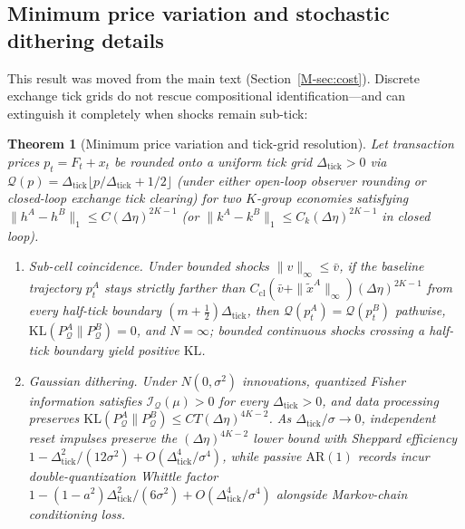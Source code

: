 \documentclass[12pt]{article}
\newtheorem{theorem}{Theorem}[section]
\theoremstyle{definition}
\theoremstyle{remark}
\newcommand{\KL}{\mathrm{KL}}
\begin{document}
\subsection{Minimum price variation and stochastic dithering details}\label{sec:mpv_supp}

\noindent This result was moved from the main text (Section~\ref{M-sec:cost}). Discrete exchange tick grids do not rescue compositional identification---and can extinguish it completely when shocks remain sub-tick:

\begin{theorem}[Minimum price variation and tick-grid resolution]\label{thm:mpv}
Let transaction prices $p_t = F_t + x_t$ be rounded onto a uniform tick grid $\Delta_{\mathrm{tick}} > 0$ via $\mathcal{Q}(p) = \Delta_{\mathrm{tick}} \lfloor p / \Delta_{\mathrm{tick}} + 1/2 \rfloor$ (under either open-loop observer rounding or closed-loop exchange tick clearing) for two $K$-group economies satisfying $\|h^A - h^B\|_1 \le C (\Delta\eta)^{2K-1}$ (or $\|k^A - k^B\|_1 \le C_k(\Delta\eta)^{2K-1}$ in closed loop).
\begin{enumerate}
  \item[(i)] \emph{Sub-cell coincidence.} Under bounded shocks $\|v\|_\infty \le \bar{v}$, if the baseline trajectory $p_t^A$ stays strictly farther than $C_{\mathrm{cl}}(\bar{v} + \|\tilde{x}^A\|_\infty)(\Delta\eta)^{2K-1}$ from every half-tick boundary $(m + \tfrac{1}{2})\Delta_{\mathrm{tick}}$, then $\mathcal{Q}(p_t^A) = \mathcal{Q}(p_t^B)$ pathwise, $\KL(P_{\mathcal{Q}}^A \| P_{\mathcal{Q}}^B) = 0$, and $N = \infty$; bounded continuous shocks crossing a half-tick boundary yield positive $\KL$.
  \item[(ii)] \emph{Gaussian dithering.} Under $N(0,\sigma^2)$ innovations, quantized Fisher information satisfies $\mathcal{I}_{\mathcal{Q}}(\mu) > 0$ for every $\Delta_{\mathrm{tick}} > 0$, and data processing preserves $\KL(P_{\mathcal{Q}}^A \| P_{\mathcal{Q}}^B) \le C T (\Delta\eta)^{4K-2}$. As $\Delta_{\mathrm{tick}}/\sigma \to 0$, independent reset impulses preserve the $(\Delta\eta)^{4K-2}$ lower bound with Sheppard efficiency $1 - \Delta_{\mathrm{tick}}^2/(12\sigma^2) + O(\Delta_{\mathrm{tick}}^4/\sigma^4)$, while passive $\mathrm{AR}(1)$ records incur double-quantization Whittle factor $1 - (1 - a^2)\Delta_{\mathrm{tick}}^2/(6\sigma^2) + O(\Delta_{\mathrm{tick}}^4/\sigma^4)$ alongside Markov-chain conditioning loss.
\end{enumerate}
\end{theorem}
\end{document}
